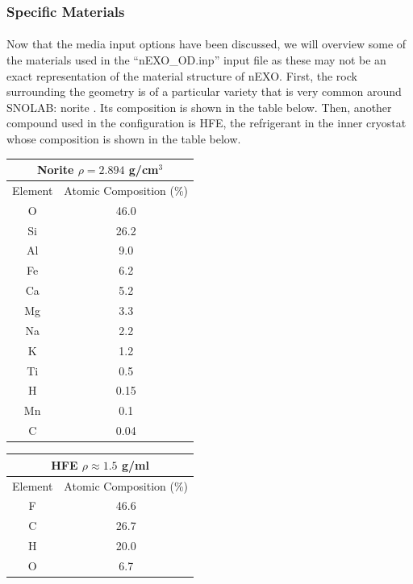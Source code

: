 \subsubsection{Specific Materials}
\paragraph{}
Now that the media input options have been discussed, we will overview some of the materials used in the ``nEXO\_OD.inp'' input file as these may not be an exact representation of the material structure of nEXO. First, the rock surrounding the geometry is of a particular variety that is very common around SNOLAB: norite \cite{SNOLAB_dose}. Its composition is shown in the table below. Then, another compound used in the configuration is HFE, the refrigerant in the inner cryostat whose composition is shown in the table below. 

\begin{center}
    \label{tab:norite}
    \begin{tabular}[h]{|c|c|}
        \hline
        \multicolumn{2}{|c|}{Norite $\rho = 2.894 $ g/cm$^3$} \\
        \hline
        \hline
        Element & Atomic Composition (\%) \\
        \hline
        O & 46.0 \\
        Si & 26.2 \\
        Al & 9.0 \\
        Fe & 6.2 \\
        Ca & 5.2 \\
        Mg & 3.3 \\
        Na & 2.2 \\
        K & 1.2 \\
        Ti & 0.5 \\
        H & 0.15 \\
        Mn & 0.1 \\
        C & 0.04 \\
        \hline
    \end{tabular}
    \quad
    \label{tab:HFE}
    \begin{tabular}[h]{|c|c|}
        \hline
        \multicolumn{2}{|c|}{HFE $\rho \approx 1.5 $ g/ml} \\
        \hline
        \hline
        Element & Atomic Composition (\%) \\
        \hline
        F & 46.6 \\
        C & 26.7 \\
        H & 20.0 \\
        O & 6.7 \\
        \hline
    \end{tabular}
\end{center}
